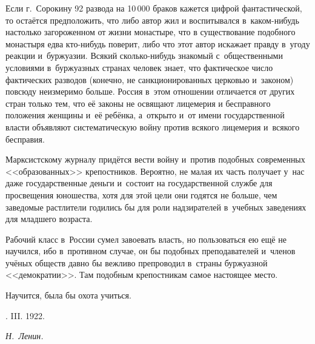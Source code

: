 Если г.~Сорокину 92 развода на 10\,000 браков кажется
цифрой фантастической, то остаётся предположить, что либо автор жил и
воспитывался в~каком-нибудь настолько загороженном от жизни монастыре, что
в существование подобного монастыря едва кто-нибудь поверит, либо что этот
автор искажает правду в~угоду реакции и~буржуазии. Всякий сколько-нибудь
знакомый с~общественными условиями в~буржуазных странах человек знает, что
фактическое число фактических разводов (конечно, не санкционированных
церковью и~законом) повсюду неизмеримо больше. Россия в~этом отношении
отличается от других стран только тем, что её законы не освящают лицемерия
и бесправного положения женщины и~её ребёнка, а~открыто и~от имени
государственной власти объявляют систематическую войну против всякого
лицемерия и~всякого бесправия.

Марксистскому журналу придётся вести войну и~против подобных современных
<<образованных>> крепостников. Вероятно, не малая их часть получает у~нас даже
государственные деньги и~состоит на государственной службе для просвещения
юношества, хотя для этой цели они годятся не больше, чем заведомые
растлители годились бы для роли надзирателей в~учебных заведениях для
младшего возраста.

Рабочий класс в~России сумел завоевать власть, но пользоваться ею ещё не
научился, ибо в~противном случае, он бы подобных преподавателей и~членов
учёных обществ давно бы вежливо препроводил в~страны буржуазной
<<демократии>>. Там подобным крепостникам самое настоящее место.

\nopagebreak
Научится, была бы охота учиться.

\nopagebreak \medskip
{}. III. 1922.
\nopagebreak \medskip

{\raggedleft \textit{Н.~Ленин.} \par}

\nopagebreak \medskip
\sectionline

\bigskip

